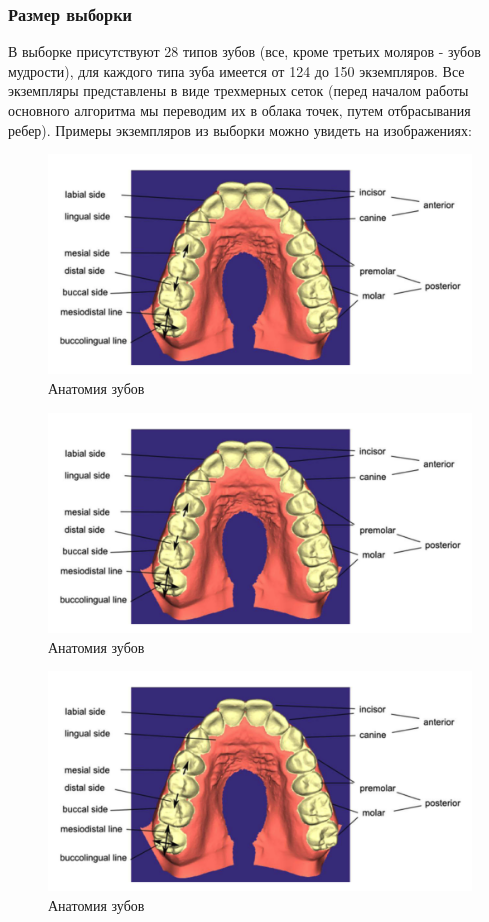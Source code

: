 
\subsubsection{Размер выборки}

В выборке присутствуют 28 типов зубов (все, кроме третьих моляров - зубов мудрости), для каждого типа зуба имеется от 124 до 150 экземпляров. Все экземпляры представлены в виде трехмерных сеток (перед началом работы основного алгоритма мы переводим их в облака точек, путем отбрасывания ребер). Примеры экземпляров из выборки можно увидеть на  изображениях:


\begin{figure}[h]
\includegraphics[width=1\linewidth]{images/dental_parts.png}
\caption{Анатомия зубов}
\label{fig:tooth_1}
\end{figure}


\begin{figure}[h]
\includegraphics[width=1\linewidth]{images/dental_parts.png}
\caption{Анатомия зубов}
\label{fig:tooth_2}
\end{figure}


\begin{figure}[h]
\includegraphics[width=1\linewidth]{images/dental_parts.png}
\caption{Анатомия зубов}
\label{fig:tooth_3}
\end{figure}